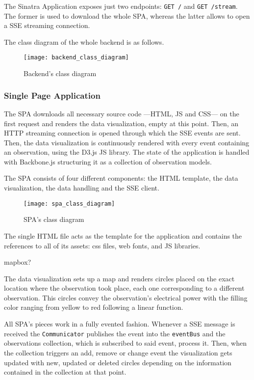 The Sinatra Application exposes just two endpoints: \texttt{GET /} and \texttt{GET /stream}. The former is used to download the whole SPA, whereas the latter allows to open a SSE streaming connection.

The class diagram of the whole backend is as follows.

\begin{figure}[H]
	\centering
	\texttt{[image: backend\_class\_diagram]}
	\caption{Backend's class diagram}
	\label{fig:backend_class_diagram}
\end{figure}

\subsubsection{Single Page Application}

The SPA downloads all necessary source code ---HTML, JS and CSS--- on the first request and renders the data visualization, empty at this point. Then, an HTTP streaming connection is opened  through which the SSE events are sent. Then, the data visualization is continuously rendered with every event containing an observation, using the D3.js JS library. The state of the application is handled with Backbone.js structuring it as a collection of observation models.

The SPA consists of four different components: the HTML template, the data visualization, the data handling and the SSE client.

\begin{figure}[p]
	\centering
	\texttt{[image: spa\_class\_diagram]}
	\caption{SPA's class diagram}
	\label{fig:spa_class_diagram}
\end{figure}

The single HTML file acts as the template for the application and contains the references to all of its assets: css files, web fonts, and JS libraries.

mapbox?

The data visualization sets up a map and renders circles placed on the exact location where the observation took place, each one corresponding to a different observation. This circles convey the observation's electrical power with the filling color ranging from yellow to red following a linear function.

All SPA's pieces work in a fully evented fashion. Whenever a SSE message is received the \texttt{Communicator} publishes the event into the \texttt{eventBus} and the observations collection, which is subscribed to said event, process it. Then, when the collection triggers an add, remove or change event the visualization gets updated with new, updated or deleted circles depending on the information contained in the collection at that point.